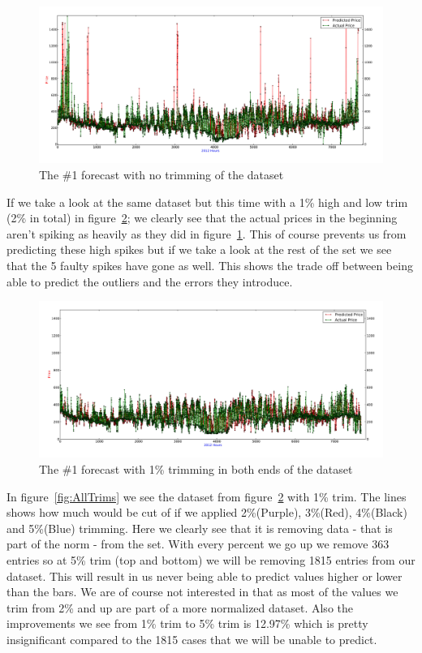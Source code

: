 \begin{figure}[H]
\centering
\includegraphics[width=0.85\linewidth,natwidth=898,natheight=587]{billeder/PriceExperimentalAnalysis/NoTrimming.jpg}
\caption{The \#1 forecast with no trimming of the dataset}
\label{fig:NoTrim}
\end{figure}

If we take a look at the same dataset but this time with a 1\% high and low trim (2\% in total) in figure~\ref{fig:1PTrim}; we clearly see that the actual prices in the beginning aren't spiking as heavily as they did in figure~\ref{fig:NoTrim}. This of course prevents us from predicting these high spikes but if we take a look at the rest of the set we see that the 5 faulty spikes have gone as well. This shows the trade off between being able to predict the outliers and the errors they introduce.

\begin{figure}[H]
\centering
\includegraphics[width=0.85\linewidth,natwidth=898,natheight=587]{billeder/PriceExperimentalAnalysis/1PTrim.jpg}
\caption{The \#1 forecast with 1\% trimming in both ends of the dataset}
\label{fig:1PTrim}
\end{figure}

In figure~\ref{fig:AllTrims} we see the dataset from figure~\ref{fig:1PTrim} with 1\% trim. The lines shows how much would be cut of if we applied 2\%(Purple), 3\%(Red), 4\%(Black) and 5\%(Blue) trimming. Here we clearly see that it is removing data - that is part of the norm - from the set. With every percent we go up we remove 363 entries so at 5\% trim (top and bottom) we will be removing 1815 entries from our dataset. This will result in us never being able to predict values higher or lower than the bars. We are of course not interested in that as most of the values we trim from 2\% and up are part of a more normalized dataset. Also the improvements we see from 1\% trim to 5\% trim is 12.97\% which is pretty insignificant compared to the 1815 cases that we will be unable to predict.


